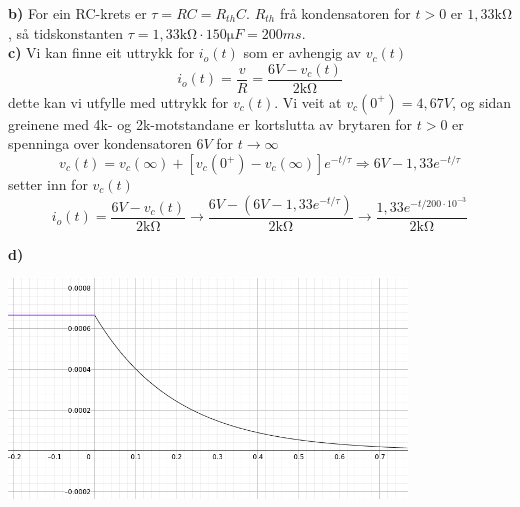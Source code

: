 \documentclass[12pt,a4paper]{article}
\begin{document}
      \textbf{b)}
      For ein RC-krets er $\tau = RC = R_{th}C$. $R_{th}$ frå kondensatoren for $t>0$ er 
      $1,33\si{\kilo\ohm}$, så tidskonstanten $\tau = 1,33\si{\kilo\ohm} \cdot 150
      \si{\micro F} = 200ms$. \\
      
      \textbf{c)}
      Vi kan finne eit uttrykk for $i_o(t)$ som er avhengig av $v_c(t)$
      \begin{equation}
        i_o(t) = \frac{v}{R} = \frac{6V - v_c(t)}{2\si{\kilo\ohm}}
      \end{equation}
      dette kan vi utfylle med uttrykk for $v_c(t)$. Vi veit at $v_c(0^+) = 4,67V$, og
      sidan greinene med 4k- og 2k-motstandane er kortslutta av brytaren for $t>0$ er
      spenninga over kondensatoren $6V$ for $t \rightarrow \infty$
      \begin{equation}
        v_c(t) = v_c(\infty) + \left[ v_c(0^+) - v_c(\infty) \right] e^{-t/\tau}
        \Rightarrow 6V - 1,33e^{-t/\tau}
      \end{equation}
      setter inn for $v_c(t)$
      \begin{equation}
        i_o(t) = \frac{6V - v_c(t)}{2\si{\kilo\ohm}} \rightarrow
        \frac{6V - (6V - 1,33e^{-t/\tau})}{2\si{\kilo\ohm}} \rightarrow
        \frac{1,33e^{-t/200\cdot 10^{-3}}}{2\si{\kilo\ohm}}
      \end{equation}

      \textbf{d)}
      \begin{center}
        \includegraphics[width=300pt]{06_12.png}
      \end{center}
\end{document}
